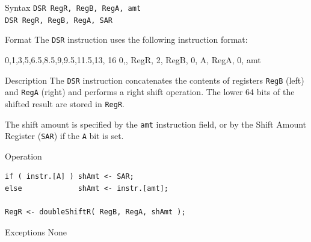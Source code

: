 %
%
\pagebreak
{}

\begin{iPageDescEntry}{Syntax}
\texttt{DSR RegR, RegB, RegA, amt} \\
\texttt{DSR RegR, RegB, RegA, SAR}
\end{iPageDescEntry}

\begin{iPageDescEntry}{Format}
The \texttt{DSR} instruction uses the following instruction format: \\

\begin{flushleft}
\drawInstrFormat
    {0,1,3,5,6.5,8.5,9,9.5,11.5,13, 16}
    {0,\OpCodeDSR, RegR, 2, RegB, 0, A, RegA, 0, amt}
\end{flushleft}
\end{iPageDescEntry}

\begin{iPageDescEntry}{Description}
The \texttt{DSR} instruction concatenates the contents of registers \texttt{RegB} (left) and \texttt{RegA} (right) and performs a right shift operation. The lower 64 bits of the shifted result are stored in \texttt{RegR}.  

The shift amount is specified by the \texttt{amt} instruction field, or by the Shift Amount Register (\texttt{SAR}) if the \texttt{A} bit is set.
\end{iPageDescEntry}

\begin{iPageDescOpEntry}{Operation}
\begin{lstlisting}[style=iPageOpStyle]
if ( instr.[A] ) shAmt <- SAR;
else             shAmt <- instr.[amt];

RegR <- doubleShiftR( RegB, RegA, shAmt );
\end{lstlisting}
\end{iPageDescOpEntry}

\begin{iPageDescEntry}{Exceptions}
None
\end{iPageDescEntry}

